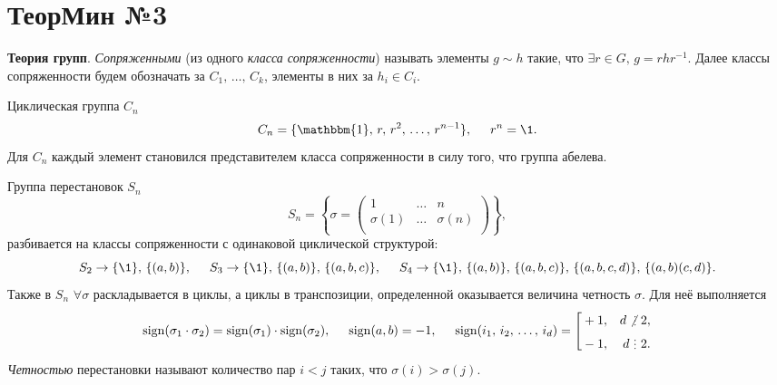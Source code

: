 \section*{ТеорМин №3}


\textbf{Теория групп}. \textit{Сопряженными} (из одного  \textit{класса сопряженности}) называть элементы $g \sim h$ такие, что $\exists r \in G,\, g = r h r^{-1}$. Далее классы сопряженности будем обозначать за $C_1,\, \ldots,\, C_k$, элементы в них за $h_i \in C_i$.

Циклическая группа $C_n$
\begin{equation*}
	C_n = \{\mathbbm{1},\, r,\, r^2,\, \ldots,\, r^{n-1}\},
	\hspace{5 mm} 
	r^{n} = \1.
\end{equation*}
Для $C_n$ каждый элемент становился представителем класса сопряженности в силу того, что группа абелева.

Группа перестановок $S_n$
\begin{equation*}
	S_n = \left\{\sigma = \begin{pmatrix}
	    1 & \ldots & n  \\
	    \sigma(1) & \ldots & \sigma(n)  \\
	\end{pmatrix}\right\},
\end{equation*}
разбивается на классы сопряженности с одинаковой циклической структурой:
\begin{equation*}
	S_2 \to \{\1\},\,  \{(a, b)\},
	\hspace{5 mm} 
	S_3 \to \{\1\},\,  \{(a, b)\},\,  \{(a, b, c)\},
	\hspace{5 mm} 
	S_4 \to \{\1\},\,  \{(a, b)\},\,  \{(a, b, c)\},\,  \{(a, b, c, d)\},\,  \{(a, b) (c, d)\}.
\end{equation*}
Также в $S_n$ $\forall  \sigma$ раскладывается в циклы, а циклы в транспозиции, определенной оказывается величина четность $\sigma$. Для неё выполняется
\begin{equation*}
	\sign(\sigma_1 \cdot \sigma_2) = \sign(\sigma_1) \cdot \sign(\sigma_2),
	\hspace{5 mm} 
	\sign(a, b) = -1,
	\hspace{5 mm} 
	\sign(i_1,\, i_2,\, \ldots,\, i_d) = \left[\begin{aligned}
	    &+1, & d\not{\hspace{-1.5pt}\2}\, 2,\\
	    &-1, & d \,\2\, 2.
	\end{aligned}\right.
\end{equation*}
\textit{Четностью} перестановки называют количество пар $i < j$ таких, что $\sigma(i) > \sigma(j)$. 

